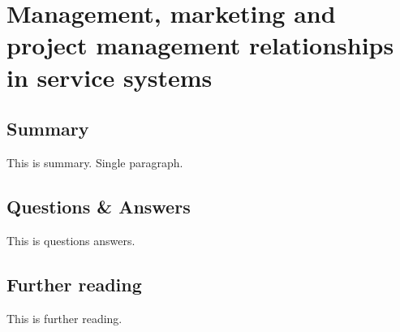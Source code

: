 \section{Management, marketing and project management relationships in service systems}

\subsection{Summary}
This is summary. Single paragraph.

\subsection{Questions \& Answers}
This is questions answers.

\subsection{Further reading}
This is further reading.
